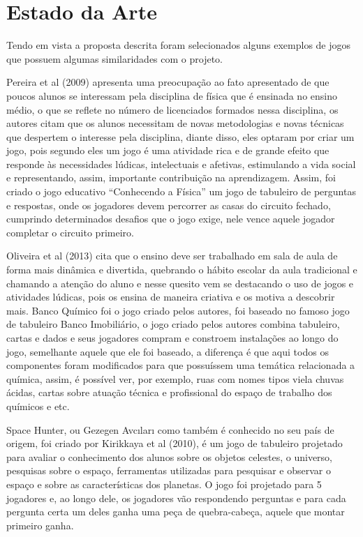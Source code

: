 \documentclass[12pt]{article}
\begin{document}
\section{Estado da Arte}

Tendo em vista a proposta descrita foram selecionados alguns exemplos de jogos que possuem algumas similaridades com o projeto.

Pereira et al (2009) apresenta uma preocupação ao fato apresentado de que poucos alunos se interessam pela disciplina de física que é ensinada no ensino médio, o que se reflete no número de licenciados formados nessa disciplina, os autores citam que os alunos necessitam de novas metodologias e novas técnicas que despertem o interesse pela disciplina, diante disso, eles optaram por criar um jogo, pois segundo eles um jogo é uma atividade rica e de grande efeito que responde às necessidades lúdicas, intelectuais e afetivas, estimulando a vida social e representando, assim, importante contribuição na aprendizagem. Assim, foi criado o jogo educativo “Conhecendo a Física” um jogo de tabuleiro de perguntas e respostas, onde os jogadores devem percorrer as casas do circuito fechado, cumprindo determinados desafios que o jogo exige, nele vence aquele jogador completar o circuito primeiro.

Oliveira et al (2013) cita que o ensino deve ser trabalhado em sala de aula de forma mais dinâmica e divertida, quebrando o hábito escolar da aula tradicional e chamando a atenção do aluno e nesse quesito vem se destacando o uso de jogos e atividades lúdicas, pois os ensina de maneira criativa e os motiva a descobrir mais. Banco Químico foi o jogo criado pelos autores, foi baseado no famoso jogo de tabuleiro Banco Imobiliário, o jogo criado pelos autores combina tabuleiro, cartas e dados e seus jogadores compram e constroem instalações ao longo do jogo, semelhante aquele que ele foi baseado, a diferença é que aqui todos os componentes foram modificados para que possuíssem uma temática relacionada a química, assim, é possível ver, por exemplo, ruas com nomes tipos viela chuvas ácidas, cartas sobre atuação técnica e profissional do espaço de trabalho dos químicos e etc.

Space Hunter, ou Gezegen Avcıları como também é conhecido no seu país de origem, foi criado por Kirikkaya et al (2010), é um jogo de tabuleiro projetado para avaliar o conhecimento dos alunos sobre os objetos celestes, o universo, pesquisas sobre o espaço, ferramentas utilizadas para pesquisar e observar o espaço e sobre as características dos planetas. O jogo foi projetado para 5 jogadores e, ao longo dele, os jogadores vão respondendo perguntas e para cada pergunta certa um deles ganha uma peça de quebra-cabeça, aquele que montar primeiro ganha.
\end{document}

